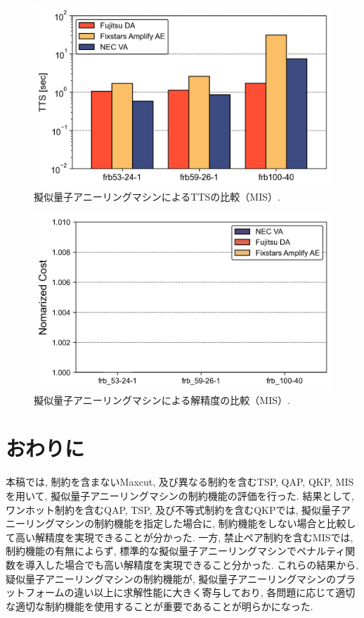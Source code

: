 \documentclass[submit,techrep,noauthor]{ipsj}
\begin{document}
\begin{figure}[ht]
\centering
\includegraphics[bb=0 0 700 230, width=15cm]{TTS_MIS.png}
\caption{擬似量子アニーリングマシンによるTTSの比較（MIS）.}
\label{TTS_MIS}
\end{figure}

\begin{figure}[ht]
\centering
\includegraphics[bb=0 0 700 230, width=15cm]{Cost_MIS_All.png}
\caption{擬似量子アニーリングマシンによる解精度の比較（MIS）.}
\label{Cost_MIS_All}
\end{figure}

\section{おわりに}
本稿では, 制約を含まないMaxcut, 及び異なる制約を含むTSP, QAP, QKP, MISを用いて, 擬似量子アニーリングマシンの制約機能の評価を行った. 結果として, ワンホット制約を含むQAP, TSP, 及び不等式制約を含むQKPでは, 擬似量子アニーリングマシンの制約機能を指定した場合に, 制約機能をしない場合と比較して高い解精度を実現できることが分かった. 一方, 禁止ペア制約を含むMISでは, 制約機能の有無によらず, 標準的な擬似量子アニーリングマシンでペナルティ関数を導入した場合でも高い解精度を実現できること分かった. 
これらの結果から, 疑似量子アニーリングマシンの制約機能が, 擬似量子アニーリングマシンのプラットフォームの違い以上に求解性能に大きく寄与しており, 各問題に応じて適切な適切な制約機能を使用することが重要であることが明らかになった.
\end{document}
